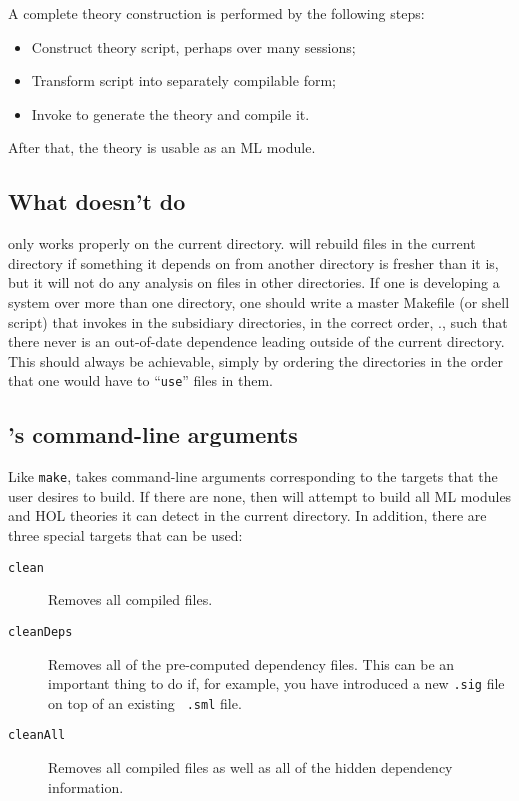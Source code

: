 A complete theory construction is performed by the following steps:
\begin{itemize}
\item Construct theory script, perhaps over many sessions;
\item Transform script into separately compilable form;
\item Invoke \holmake{} to generate the theory and compile it.
\end{itemize}

After that, the theory is usable as an ML module.

\subsection{What \holmake{} doesn't do}

\holmake{} only works properly on the current directory.  \holmake{}
will rebuild files in the current directory if something it depends on
from another directory is fresher than it is, but it will not do any
analysis on files in other directories.  If one is developing a system
over more than one directory, one should write a master Makefile (or
shell script) that invokes \holmake{} in the subsidiary directories,
in the correct order, \ie., such that there never is an out-of-date
dependence leading outside of the current directory. This should
always be achievable, simply by ordering the directories in the order
that one would have to ``\verb+use+'' files in them.

\subsection{\holmake{}'s command-line arguments}

Like {\tt make}, \holmake{} takes command-line arguments corresponding
to the targets that the user desires to build.  If there are none,
then \holmake{} will attempt to build all ML modules and HOL theories
it can detect in the current directory.  In addition, there are three
special targets that can be used:
\begin{description}
\item[{\tt clean}] Removes all compiled files.
\item [{\tt cleanDeps}] Removes all of the pre-computed dependency
  files.  This can be an important thing to do if, for example, you
  have introduced a new {\tt .sig} file on top of an existing {\tt
    .sml} file.
\item [{\tt cleanAll}] Removes all compiled files as well as all of
  the hidden dependency information.
\end{description}

